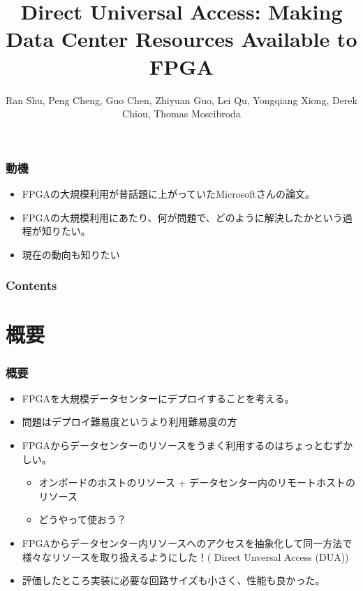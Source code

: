 \documentclass[dvipdfmx,9pt,notheorems]{beamer}
\title{Direct Universal Access: Making Data Center Resources Available to FPGA}
\author{Ran Shu\footnotemark[1], Peng Cheng\footnotemark[1], Guo Chen\footnotemark[1,2], Zhiyuan Guo\footnotemark[1,3], Lei Qu\footnotemark[1], Yongqiang Xiong\footnotemark[1], Derek Chiou\footnotemark[4], Thomas Moscibroda\footnotemark[4]}
\institute{\footnotemark[1]Microsoft Research, \footnotemark[2]Hunan University, \footnotemark[3]Beihang University, \footnotemark[4]Microsoft Azure}
\theoremstyle{definition}
\begin{document}
\begin{frame}[plain]\frametitle{}
\titlepage %
\end{frame}

\begin{frame}\frametitle{動機}
	\begin{itemize}
		\item FPGAの大規模利用が昔話題に上がっていたMicrosoftさんの論文。
		\item FPGAの大規模利用にあたり、何が問題で、どのように解決したかという過程が知りたい。
		\item 現在の動向も知りたい
	\end{itemize}
\end{frame}

\begin{frame}\frametitle{Contents}
\raggedright
\tableofcontents
\end{frame}

\section{概要}
\begin{frame}\frametitle{概要}
\begin{itemize}
	\item FPGAを大規模データセンターにデプロイすることを考える。
	\item 問題はデプロイ難易度というより{\color{orange}利用難易度}の方
	\item {\color{red} FPGAからデータセンターのリソースをうまく利用する}のはちょっとむずかしい。
  	\begin{itemize}
			\item オンボードのホストのリソース + データセンター内のリモートホストのリソース
  		\item どうやって使おう？
  	\end{itemize}
	\item FPGAからデータセンター内リソースへのアクセスを抽象化して同一方法で様々なリソースを取り扱えるようにした！({\color{red} Direct Unversal Access} (DUA))
	\item 評価したところ実装に必要な回路サイズも小さく、性能も良かった。
\end{itemize}
\end{frame}
\end{document}
